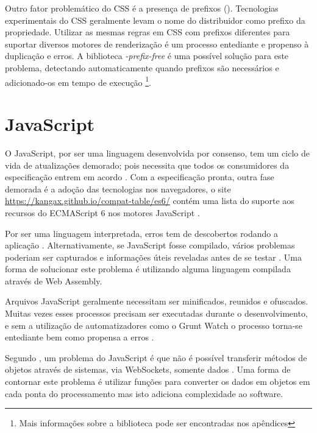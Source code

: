Outro fator problemático do CSS é a presença de prefixos
(). Tecnologias experimentais do CSS geralmente
levam o nome do distribuidor como prefixo da propriedade. Utilizar as
mesmas regras em CSS com prefixos diferentes para suportar diversos
motores de renderização é um processo entediante e propenso à
duplicação e erros. A biblioteca \textit{-prefix-free} é uma
possível solução para este problema, detectando automaticamente
quando prefixos são necessários e adicionado-os em tempo de execução
\footnote{Mais informações sobre a biblioteca pode ser encontradas nos
apêndices}.

\section{JavaScript}

O JavaScript, por ser uma linguagem desenvolvida por consenso,
tem um ciclo de vida de atualizações demorado; pois necessita
que todos os consumidores da especificação entrem em acordo
. Com a especificação pronta,
outra fase demorada é a adoção das tecnologias nos navegadores,
o site \url{https://kangax.github.io/compat-table/es6/} contém uma
lista do suporte aos recursos do ECMAScript 6 nos motores JavaScript
.

Por ser uma linguagem interpretada, erros tem de descobertos rodando a
aplicação . Alternativamente,
se JavaScript fosse compilado, vários problemas poderiam ser capturados
e informações úteis reveladas antes de se testar \autocite[p.
12]{viabilityBusinessApplications}. Uma forma de solucionar 
este problema é utilizando alguma linguagem compilada através de 
Web Assembly.

Arquivos JavaScript geralmente necessitam ser minificados, reunidos e
ofuscados. Muitas vezes esses processos precisam ser executadas durante
o desenvolvimento, e sem a utilização de automatizadores como o
Grunt Watch o processo torna-se entediante bem como propensa a erros
.

Segundo \citet{htmlResearchJournal}, um problema do JavaScript é que
não é possível transferir métodos de objetos através de sistemas,
via WebSockets, somente dados .
Uma forma de contornar este problema é utilizar funções para
converter os dados em objetos em cada ponta do processamento mas isto
adiciona complexidade ao software.

